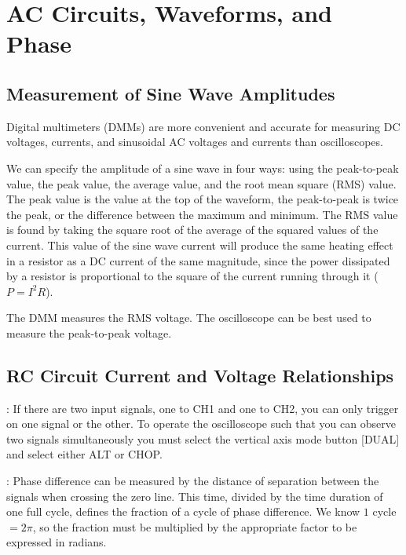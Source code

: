 \chapter{AC Circuits, Waveforms, and Phase}

\section{Measurement of Sine Wave Amplitudes}

Digital multimeters (DMMs) are more convenient and accurate for measuring DC voltages, currents, and sinusoidal AC voltages and currents than oscilloscopes.

We can specify the amplitude of a sine wave in four ways: using the peak-to-peak value, the peak value, the average value, and the root mean square (RMS) value. The peak value is the value at the top of the waveform, the peak-to-peak is twice the peak, or the difference between the maximum and minimum. The RMS value is found by taking the square root of the average of the squared values of the current. This value of the sine wave current will produce the same heating effect in a resistor as a DC current of the same magnitude, since the power dissipated by a resistor is proportional to the square of the current running through it ($P = I^2R$).

The DMM measures the RMS voltage. The oscilloscope can be best used to measure the peak-to-peak voltage.

\section{RC Circuit Current and Voltage Relationships}

\begin{rmk}
    : If there are two input signals, one to CH1 and one to CH2, you can only trigger on one signal or the other. To operate the oscilloscope such that you can observe two signals simultaneously you must select the vertical axis mode button [DUAL] and select either ALT or CHOP.
\end{rmk}

\begin{rmk}
    : Phase difference can be measured by the distance of separation between the signals when crossing the zero line. This time, divided by the time duration of one full cycle, defines the fraction of a cycle of phase difference. We know $1$ cycle $= 2\pi$, so the fraction must be multiplied by the appropriate factor to be expressed in radians.
\end{rmk}


